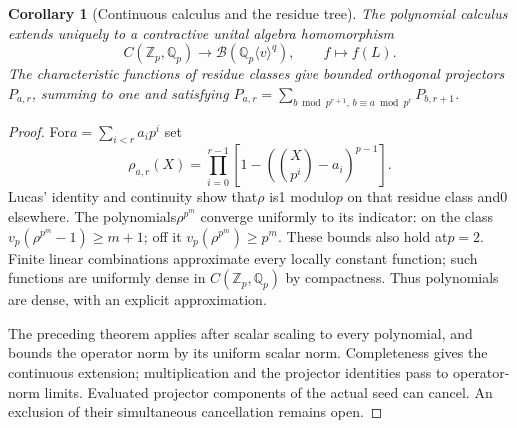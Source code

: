\documentclass[11pt]{article}
\newtheorem{corollary}[lemma]{Corollary}
\begin{document}
\begin{corollary}[Continuous calculus and the residue tree]
\label{cor:continuous}
The polynomial calculus extends uniquely to a contractive
unital algebra homomorphism
\[
 C(\mathbb Z_p,\mathbb Q_p)\longrightarrow
       \mathcal B(\mathbb Q_p\langle v\rangle^q),\qquad f\mapsto f(L).
\]
The characteristic functions of residue classes give bounded
orthogonal projectors$P_{a,r}$, summing to one and satisfying
$P_{a,r}=\sum_{b\bmod p^{r+1},\,b\equiv a\bmod p^r}P_{b,r+1}$.
\end{corollary}
\begin{proof}
For$a=\sum_{i<r}a_ip^i$ set
\[
 \rho_{a,r}(X)=\prod_{i=0}^{r-1}
       \left[1-\left(\binom X{p^i}-a_i\right)^{p-1}\right].
\]
Lucas' identity and continuity show that$\rho$ is1 modulo$p$
on that residue class and0 elsewhere.
The polynomials$\rho^{p^m}$ converge uniformly to its indicator:
on the class$v_p(\rho^{p^m}-1)\ge m+1$; off it
$v_p(\rho^{p^m})\ge p^m$.
These bounds also hold at$p=2$.
Finite linear combinations approximate every locally constant
function; such functions are uniformly dense in
$C(\mathbb Z_p,\mathbb Q_p)$ by compactness.
Thus polynomials are dense, with an explicit approximation.

The preceding theorem applies after scalar scaling to every
polynomial, and bounds the operator norm by its uniform scalar norm.
Completeness gives the continuous extension; multiplication
and the projector identities pass to operator-norm limits.
Evaluated projector components of the actual seed can cancel.
An exclusion of their simultaneous cancellation remains open.
\end{proof}
\end{document}
